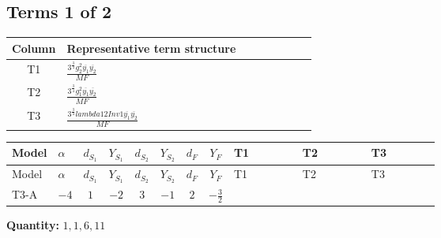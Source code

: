 \documentclass[8pt]{article}
\begin{document}
\begin{landscape}
\subsection*{Terms 1 of 2}
\begin{center}
\begin{tabular}{@{}c >{\raggedright\arraybackslash}p{0.82\linewidth}@{}}
\toprule
Column & Representative term structure \\
\midrule
T1 & \(\displaystyle \frac{3^{\frac{3}{4}} g_{2}^{2} \overline{y_{1}} \overline{y_{2}}}{MF}\) \\
\midrule
T2 & \(\displaystyle \frac{3^{\frac{3}{4}} g_{1}^{2} \overline{y_{1}} \overline{y_{2}}}{MF}\) \\
\midrule
T3 & \(\displaystyle \frac{3^{\frac{3}{4}} lambda12Inv1 \overline{y_{1}} \overline{y_{2}}}{MF}\) \\
\midrule
\bottomrule
\end{tabular}
\end{center}
\smallskip
\tiny
\begin{longtable}{@{}llcccccc >{\raggedright\arraybackslash}p{0.21\linewidth} >{\raggedright\arraybackslash}p{0.21\linewidth} >{\raggedright\arraybackslash}p{0.21\linewidth}@{}}
\toprule
Model & $\alpha$ & $d_{S_1}$ & $Y_{S_1}$ & $d_{S_2}$ & $Y_{S_2}$ & $d_F$ & $Y_F$ & T1 & T2 & T3 \\
\midrule
\endfirsthead
\toprule
Model & $\alpha$ & $d_{S_1}$ & $Y_{S_1}$ & $d_{S_2}$ & $Y_{S_2}$ & $d_F$ & $Y_F$ & T1 & T2 & T3 \\
\midrule
\endhead
T3-A & $-4$ & $1$ & $-2$ & $3$ & $-1$ & $2$ & $-\frac{3}{2}$ & \scriptsize\adjustbox{max width=\linewidth}{$\begin{gathered} - \frac{17 \cdot 3^{\frac{3}{4}} g_{2}^{2} \overline{y_{1}} \overline{y_{2}}}{24 MF}\end{gathered}$} & \scriptsize\adjustbox{max width=\linewidth}{$\begin{gathered} - \frac{9 \cdot 3^{\frac{3}{4}} g_{1}^{2} \overline{y_{1}} \overline{y_{2}}}{8 MF}\end{gathered}$} & \scriptsize\adjustbox{max width=\linewidth}{$\begin{gathered} - \frac{3^{\frac{3}{4}} lambda12Inv1 \overline{y_{1}} \overline{y_{2}}}{6 MF}\end{gathered}$} \\
\midrule
\bottomrule
\end{longtable}
\clearpage
\noindent\textbf{Quantity: }$\mathrm{1,1,6,11}$\par\smallskip

\end{landscape}
\end{document}
